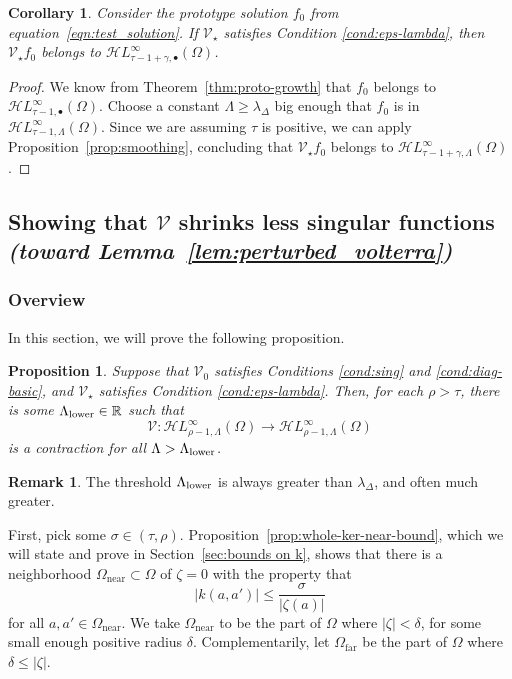 \documentclass{article}
\theoremstyle{definition}
\newtheorem{rmk}{Remark}
\theoremstyle{plain}
\newtheorem{proposition}{Proposition}
\newtheorem{corollary}{Corollary}
\newcommand{\R}{\mathbb{R}}
\newcommand{\singexp}[2]{\mathcal{H}L^\infty_{#1, #2}}
\newcommand{\singexpalg}[1]{\singexp{#1}{\bullet}}
\newcommand{\volterra}{\mathcal{V}}
\newcommand{\hardpart}{\mathcal{V}_0}
\newcommand{\softpart}{\mathcal{V}_\star}
\newcommand{\solproto}{f_0}
\newcommand{\domain}{\Omega}
\newcommand{\near}{\Omega_\text{near}}
\newcommand{\far}{\Omega_\text{far}}
\begin{document}
\begin{corollary}\label{cor:pertub_f0}
Consider the prototype solution $\solproto$ from equation~\eqref{eqn:test_solution}. If $\softpart$ satisfies {\em Condition \eqref{cond:eps-lambda}}, then $\softpart \solproto$ belongs to $\singexpalg{\tau-1+\gamma}(\domain)$.
\end{corollary}
\begin{proof}
We know from Theorem~\ref{thm:proto-growth} that $\solproto$ belongs to $\singexpalg{\tau-1}(\domain)$. Choose a constant $\Lambda \ge \lambda_\Delta$ big enough that $\solproto$ is in $\singexp{\tau-1}{\Lambda}(\domain)$. Since we are assuming $\tau$ is positive, we can apply Proposition~\ref{prop:smoothing}, concluding that $\softpart \solproto$ belongs to $\singexp{\tau-1+\gamma}{\Lambda}(\domain)$.
\end{proof}
\subsection{Showing that $\volterra$ shrinks less singular functions \\ \textit{(toward Lemma~\ref{lem:perturbed_volterra})}}\label{sec:V is a contraction}
\subsubsection{Overview}
In this section, we will prove the following proposition. %

\begin{proposition}\label{prop:get-contraction}
Suppose that $\hardpart$ satisfies {\em Conditions \eqref{cond:sing}} and \eqref{cond:diag-basic}, and $\softpart$ satisfies {\em Condition \eqref{cond:eps-lambda}}. Then, for each $\rho > \tau$, there is some $\Lambda_\text{\rm lower} \in \R$ such that
\[\volterra\colon\singexp{\rho-1}{\Lambda}(\domain)\to\singexp{\rho-1}{\Lambda}(\domain)\]
is a contraction for all $\Lambda > \Lambda_\text{\rm lower}$.
\end{proposition}
\begin{rmk}
The threshold $\Lambda_\text{\rm lower}$ is always greater than $\lambda_\Delta$, and often much greater.
\end{rmk}
First, pick some $\sigma \in (\tau, \rho)$. Proposition~\ref{prop:whole-ker-near-bound}, which we will state and prove in Section~\ref{sec:bounds on k}, shows that there is a neighborhood $\near \subset \domain$ of $\zeta = 0$ with the property that
\begin{equation}\label{near-limit}
|k(a, a')| \le \frac{\sigma}{|\zeta(a)|}
\end{equation}
for all $a, a' \in \near$. We take $\near$ to be the part of $\domain$ where $|\zeta| < \delta$, for some small enough positive radius $\delta$. Complementarily, let $\far$ be the part of $\domain$ where $\delta \le |\zeta|$.
\end{document}

